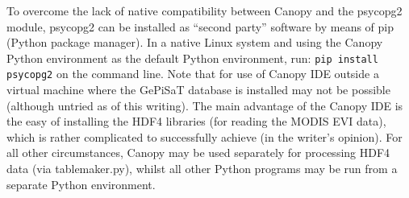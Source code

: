 To overcome the lack of native compatibility between Canopy and the psycopg2 module, psycopg2 can be installed as ``second party'' software by means of pip (Python package manager).
In a native Linux system and using the Canopy Python environment as the default Python environment, run: \texttt{pip install psycopg2} on the command line.
Note that for use of Canopy IDE outside a virtual machine where the GePiSaT database is installed may not be possible (although untried as of this writing).
The main advantage of the Canopy IDE is the easy of installing the HDF4 libraries (for reading the MODIS EVI data), which is rather complicated to successfully achieve (in the writer's opinion).  
For all other circumstances, Canopy may be used separately for processing HDF4 data (via table\textunderscore maker.py), whilst all other Python programs may be run from a separate Python environment.  

